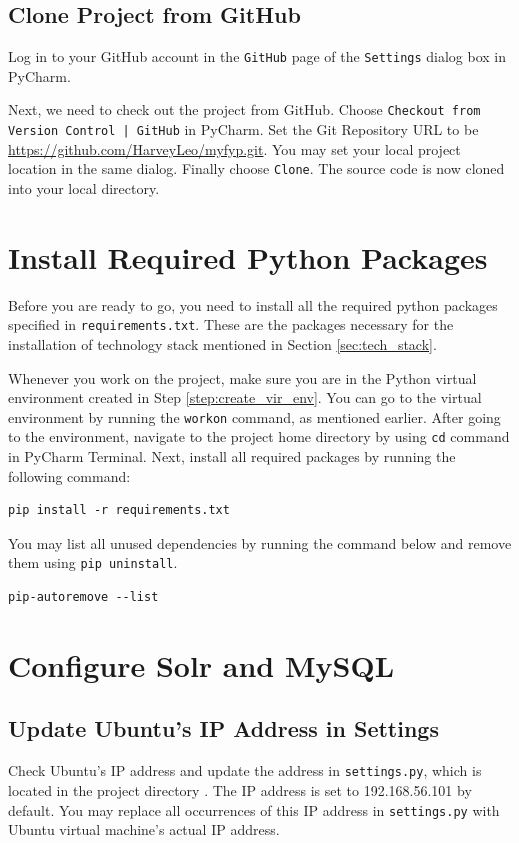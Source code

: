 \subsection{Clone Project from GitHub}
Log in to your GitHub account in the \texttt{GitHub} page of the \texttt{Settings} dialog box in PyCharm. 

Next, we need to check out the project from GitHub. Choose \texttt{Checkout from Version Control | GitHub} in PyCharm. Set the Git Repository URL to be \url{https://github.com/HarveyLeo/myfyp.git}. You may set your local project location in the same dialog. Finally choose \texttt{Clone}. The source code is now cloned into your local directory.

\section{Install Required Python Packages}
Before you are ready to go, you need to install all the required python packages specified in \texttt{requirements.txt}. These are the packages necessary for the installation of technology stack mentioned in Section \ref{sec:tech_stack}.

Whenever you work on the project, make sure you are in the Python virtual environment created in Step \ref{step:create_vir_env}. You can go to the virtual environment by running the \texttt{workon} command, as mentioned earlier. After going to the environment, navigate to the project home directory  by using \texttt{cd} command in PyCharm Terminal. Next, install all required packages by running the following command:
\begin{verbatim}
pip install -r requirements.txt
\end{verbatim}

You may list all unused dependencies by running the command below and remove them using \texttt{pip uninstall}.
\begin{verbatim}
pip-autoremove --list
\end{verbatim}

\section{Configure Solr and MySQL}
\subsection{Update Ubuntu's IP Address in Settings}
Check Ubuntu's IP address and update the address in \texttt{settings.py}, which is located in the project directory . The IP address is set to 192.168.56.101 by default. You may replace all occurrences of this IP address in \texttt{settings.py} with Ubuntu virtual machine's actual IP address.

